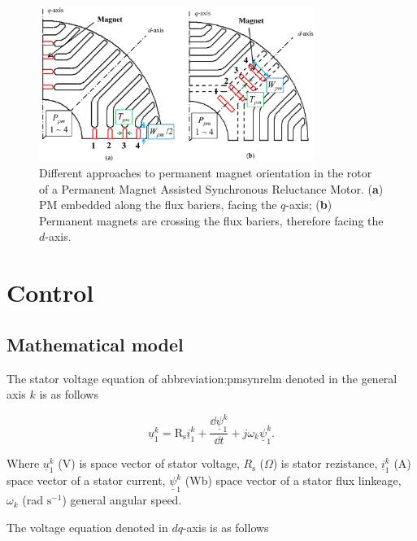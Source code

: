 \documentclass[a4paper, twoside, 11pt]{article}
\begin{document}
    \begin{figure}[htbp!]
            \centering
            \includegraphics[width=0.8\textwidth]{src/png/pmsynrelm-rotor-magnets-position.png}
            \caption{Different approaches to permanent magnet orientation in the rotor of a Permanent Magnet Assisted Synchronous Reluctance Motor. (\textbf{a}) PM embedded along the flux bariers, facing the $q$-axis; (\textbf{b}) Permanent magnets are crossing the flux bariers, therefore facing the $d$-axis. \cite{ngo-performance-analysis-of-synchronous-reluctance-motor-with-limited-amount-of-permanent-magnet}}
            \label{fig:pmsynrelm-rotor-magnets-position}
    \end{figure}


\section{Control}

    \subsection{Mathematical model}
        The stator voltage equation of \gls{abbreviation:pmsynrelm} denoted in the general axis $k$ is as follows

        \begin{equation}
            \underline{u}^k_1 = \text{R}_\text{s} \underline{i}^k_1 + \frac{\dd \underline{\psi}^k_1 }{\dd t} + j \omega_k \underline{\psi}^k_1.
        \end{equation}

        Where $\underline{u}^k_1$ (V) is space vector of stator voltage, $R_\text{s}$ ($\Omega$) is stator rezistance, $\underline{i}^k_1$ (A) space vector of a stator current, $\underline{\psi}^k_1$ (Wb) space vector of a stator flux linkeage, $\omega_k$ (rad $\text{s}^{-1}$) general angular speed.\par
        The voltage equation denoted in $dq$-axis is as follows
\end{document}
